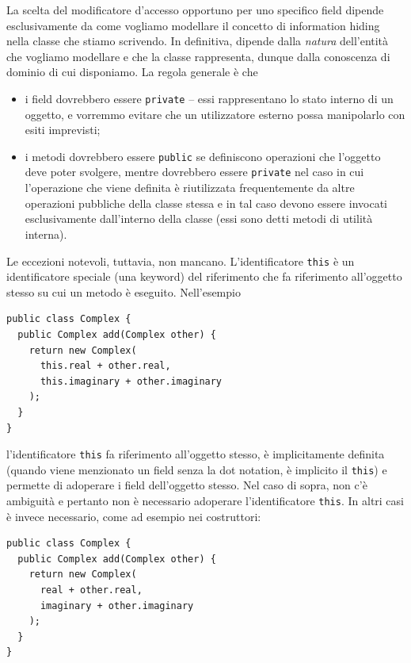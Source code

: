 \documentclass[\fontsizeclass,twocolumn]{\classname}
\theoremstyle{definition}
\theoremstyle{definition}
\begin{document}
La scelta del modificatore d'accesso opportuno per uno specifico field dipende
esclusivamente da come vogliamo modellare il concetto di information hiding
nella classe che stiamo scrivendo. In definitiva, dipende dalla \emph{natura}
dell'entità che vogliamo modellare e che la classe rappresenta, dunque dalla
conoscenza di dominio di cui disponiamo. La regola generale è che
\begin{itemize}
        \item i field dovrebbero essere \texttt{private} \--- essi
                rappresentano lo stato interno di un oggetto, e vorremmo
                evitare che un utilizzatore esterno possa manipolarlo con esiti
                imprevisti;
        \item i metodi dovrebbero essere \texttt{public} se definiscono
                operazioni che l'oggetto deve poter svolgere, mentre dovrebbero
                essere \texttt{private} nel caso in cui l'operazione che viene
                definita è riutilizzata frequentemente da altre operazioni
                pubbliche della classe stessa e in tal caso devono essere
                invocati esclusivamente dall'interno della classe (essi sono detti metodi di
                utilità interna).
\end{itemize}

Le eccezioni notevoli, tuttavia, non mancano.
L'identificatore \texttt{this} è un identificatore speciale (una keyword) del
riferimento che fa riferimento all'oggetto stesso su cui un metodo è eseguito.
Nell'esempio

\begin{lstlisting}
public class Complex {
  public Complex add(Complex other) {
    return new Complex(
      this.real + other.real,
      this.imaginary + other.imaginary
    );
  }
}
\end{lstlisting}

l'identificatore \texttt{this} fa riferimento all'oggetto stesso, è
implicitamente definita (quando viene menzionato un field senza la dot
notation, è implicito il \texttt{this}) e permette di adoperare i field
dell'oggetto stesso. Nel caso di sopra, non c'è ambiguità e pertanto non è
necessario adoperare l'identificatore \texttt{this}. In altri casi è invece
necessario, come ad esempio nei costruttori:

\begin{lstlisting}
public class Complex {
  public Complex add(Complex other) {
    return new Complex(
      real + other.real,
      imaginary + other.imaginary
    );
  }
}
\end{lstlisting}
\end{document}
